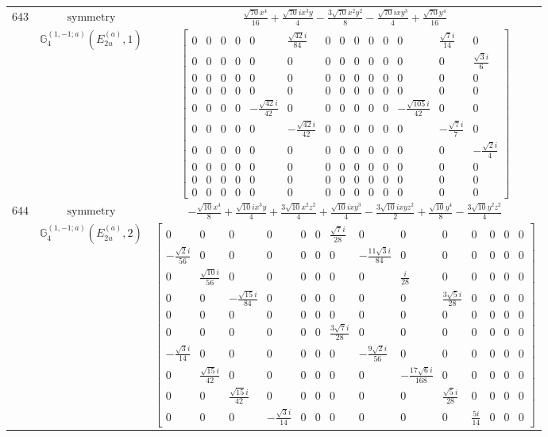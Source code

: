 \documentclass[fleqn,8pt,landscape]{jsarticle}
\begin{document}
\begin{longtable}{ccc}
$ 643 $ & $ \text{symmetry} $ & $ \frac{\sqrt{70} x^{4}}{16} + \frac{\sqrt{70} i x^{3} y}{4} - \frac{3 \sqrt{70} x^{2} y^{2}}{8} - \frac{\sqrt{70} i x y^{3}}{4} + \frac{\sqrt{70} y^{4}}{16} $ \\
$  $ & $ \mathbb{G}_{4}^{(1,-1;a)}(E_{2u}^{(a)},1) $ & $ \begin{bmatrix} 0 & 0 & 0 & 0 & 0 & \frac{\sqrt{42} i}{84} & 0 & 0 & 0 & 0 & 0 & 0 & \frac{\sqrt{7} i}{14} & 0 \\ 0 & 0 & 0 & 0 & 0 & 0 & 0 & 0 & 0 & 0 & 0 & 0 & 0 & \frac{\sqrt{3} i}{6} \\ 0 & 0 & 0 & 0 & 0 & 0 & 0 & 0 & 0 & 0 & 0 & 0 & 0 & 0 \\ 0 & 0 & 0 & 0 & 0 & 0 & 0 & 0 & 0 & 0 & 0 & 0 & 0 & 0 \\ 0 & 0 & 0 & 0 & - \frac{\sqrt{42} i}{42} & 0 & 0 & 0 & 0 & 0 & 0 & - \frac{\sqrt{105} i}{42} & 0 & 0 \\ 0 & 0 & 0 & 0 & 0 & - \frac{\sqrt{42} i}{42} & 0 & 0 & 0 & 0 & 0 & 0 & - \frac{\sqrt{7} i}{7} & 0 \\ 0 & 0 & 0 & 0 & 0 & 0 & 0 & 0 & 0 & 0 & 0 & 0 & 0 & - \frac{\sqrt{2} i}{4} \\ 0 & 0 & 0 & 0 & 0 & 0 & 0 & 0 & 0 & 0 & 0 & 0 & 0 & 0 \\ 0 & 0 & 0 & 0 & 0 & 0 & 0 & 0 & 0 & 0 & 0 & 0 & 0 & 0 \\ 0 & 0 & 0 & 0 & 0 & 0 & 0 & 0 & 0 & 0 & 0 & 0 & 0 & 0 \end{bmatrix} $ \\ \hline
$ 644 $ & $ \text{symmetry} $ & $ - \frac{\sqrt{10} x^{4}}{8} + \frac{\sqrt{10} i x^{3} y}{4} + \frac{3 \sqrt{10} x^{2} z^{2}}{4} + \frac{\sqrt{10} i x y^{3}}{4} - \frac{3 \sqrt{10} i x y z^{2}}{2} + \frac{\sqrt{10} y^{4}}{8} - \frac{3 \sqrt{10} y^{2} z^{2}}{4} $ \\
$  $ & $ \mathbb{G}_{4}^{(1,-1;a)}(E_{2u}^{(a)},2) $ & $ \begin{bmatrix} 0 & 0 & 0 & 0 & 0 & 0 & \frac{\sqrt{7} i}{28} & 0 & 0 & 0 & 0 & 0 & 0 & 0 \\ - \frac{\sqrt{2} i}{56} & 0 & 0 & 0 & 0 & 0 & 0 & - \frac{11 \sqrt{3} i}{84} & 0 & 0 & 0 & 0 & 0 & 0 \\ 0 & \frac{\sqrt{10} i}{56} & 0 & 0 & 0 & 0 & 0 & 0 & \frac{i}{28} & 0 & 0 & 0 & 0 & 0 \\ 0 & 0 & - \frac{\sqrt{15} i}{84} & 0 & 0 & 0 & 0 & 0 & 0 & \frac{3 \sqrt{5} i}{28} & 0 & 0 & 0 & 0 \\ 0 & 0 & 0 & 0 & 0 & 0 & 0 & 0 & 0 & 0 & 0 & 0 & 0 & 0 \\ 0 & 0 & 0 & 0 & 0 & 0 & \frac{3 \sqrt{7} i}{28} & 0 & 0 & 0 & 0 & 0 & 0 & 0 \\ - \frac{\sqrt{3} i}{14} & 0 & 0 & 0 & 0 & 0 & 0 & - \frac{9 \sqrt{2} i}{56} & 0 & 0 & 0 & 0 & 0 & 0 \\ 0 & \frac{\sqrt{15} i}{42} & 0 & 0 & 0 & 0 & 0 & 0 & - \frac{17 \sqrt{6} i}{168} & 0 & 0 & 0 & 0 & 0 \\ 0 & 0 & \frac{\sqrt{15} i}{42} & 0 & 0 & 0 & 0 & 0 & 0 & \frac{\sqrt{5} i}{28} & 0 & 0 & 0 & 0 \\ 0 & 0 & 0 & - \frac{\sqrt{3} i}{14} & 0 & 0 & 0 & 0 & 0 & 0 & \frac{5 i}{14} & 0 & 0 & 0 \end{bmatrix} $ \\ \hline

\end{longtable}
\end{document}
